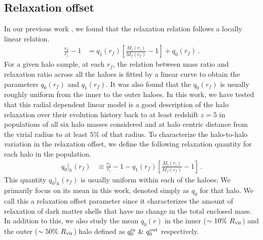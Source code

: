 \subsection{Relaxation offset}
In our previous work \cite{2023Velmani&Paranjape}, we found that 
the relaxation relation follows a locally linear relation. 
\begin{align}
    \label{eq:chi-linear-q0}
    \frac{r_f}{r_i} - 1 &= q_1(r_f) \left[ \frac{M_i(r_i)}{M_f(r_f)} - 1 \right] + q_0(r_f)\,.
\end{align}
For a given halo sample, at each $r_f$, the relation between mass ratio and relaxation ratio across all the haloes is fitted by a linear curve to obtain the parameters $q_0(r_f)$ and $q_1(r_f)$. It was also found that the $q_0(r_f)$ is usually roughly uniform from the inner to the outer haloes. In this work, we have tested that this radial dependent linear model is a good description of the halo relaxation over their evolution history back to at least redshift $z=5$ in populations of all six halo masses considered and at halo centric distance from the virial radius to at least $5 \%$ of that radius. To characterize the halo-to-halo variation in the relaxation offset, we define the following relaxation quantity for each halo in the population. 
\begin{align}
\label{eq:def-q0hal}
q_0 |_{h}(r_f) &\equiv \frac{r_f}{r_i} - 1 - q_1(r_f) \left[ \frac{M_i(r_i)}{M_f(r_f)} - 1 \right]\,.
\end{align}
This quantity $q_0 |_{h}(r_f)$ is usually uniform within each of the haloes; We primarily focus on its mean in this work, denoted simply as $q_0$ for that halo. We call this a relaxation offset parameter since it characterizes the amount of relaxation of dark matter shells that have no change in the total enclosed mass. In addition to this, we also study the mean $q_0(r)$ in the inner ($\sim 10\%~R_{\rm{vir}}$) and the outer ($\sim 50\%~R_{\rm{vir}}$) halo defined as $q_0^{\rm{in}} ~\& ~q_0^{\rm{out}}$ respectively.

